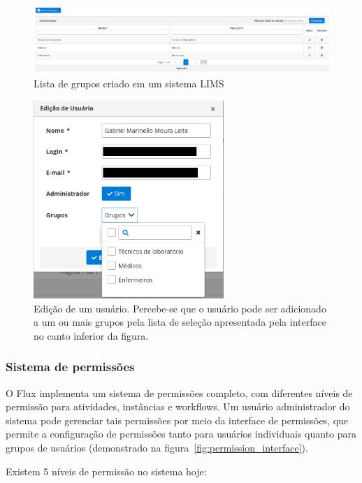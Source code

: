 \begin{figure}
    \centering
    \includegraphics[width=\textwidth]{imgs/Flux/Grupos/listaDeGrupos.png}
    \caption{Lista de grupos criado em um sistema LIMS}
    \label{fig:groups_list}
\end{figure}

\begin{figure}
    \centering
    \includegraphics[width=\textwidth, height=7.5cm, keepaspectratio]{imgs/Flux/Usuarios/edicaoUsuario.png}
    \caption{Edição de um usuário. Percebe-se que o usuário pode ser adicionado a um ou mais grupos pela lista de seleção apresentada pela interface no canto inferior da figura.}
    \label{fig:user_edit}
\end{figure}

\subsubsection{Sistema de permissões}

O Flux implementa um sistema de permissões completo, com diferentes níveis de permissão para atividades, instâncias e workflows.
Um usuário administrador do sistema pode gerenciar tais permissões por meio da interface de permissões, que permite a configuração de permissões tanto para usuários individuais quanto para grupos de usuários (demonstrado na figura~\ref{fig:permission_interface}).

Existem 5 níveis de permissão no sistema hoje:

